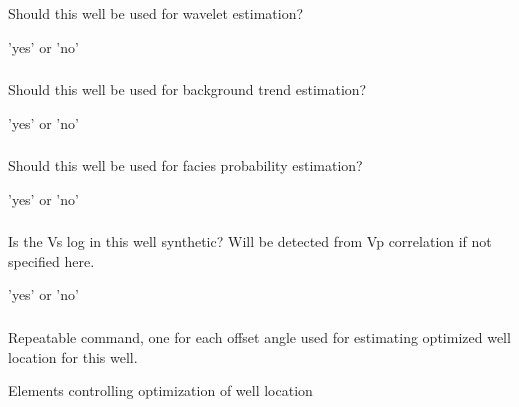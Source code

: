 \subsubsection{}
 \slist
   \item \Description Should this well be used for wavelet estimation?
   \item \Argument 'yes' or 'no'
   \item \Default
 \elist

\subsubsection{}
 \slist
   \item \Description Should this well be used for background trend estimation?
   \item \Argument 'yes' or 'no'
   \item \Default
 \elist

\subsubsection{}
 \slist
   \item \Description Should this well be used for facies probability estimation?
   \item \Argument 'yes' or 'no'
   \item \Default
 \elist

\subsubsection{}
 \slist
   \item \Description Is the Vs log in this well synthetic? Will be detected from Vp correlation if not specified here.
   \item \Argument 'yes' or 'no'
   \item \Default
 \elist

\subsubsection{}
 \slist
   \item \Description Repeatable command, one for each offset angle used for estimating optimized well location for this well.
   \item \Argument Elements controlling optimization of well location
   \item \Default
 \elist

